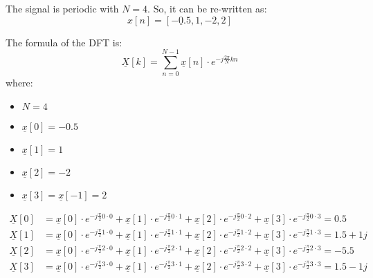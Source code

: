 \begin{solution}
	The signal is periodic with $N = 4$. So, it can be re-written as:
	\begin{equation*}
		x[n] = \left[\underline{-0.5}, 1, -2, 2\right]
	\end{equation*}
	
	\begin{tasks}
		\task
		The formula of the DFT is:
		\begin{equation}
			\underline{X}[k] = \sum\limits_{n = 0}^{N - 1} \underline{x}[n] \cdot e^{- j \frac{2 \pi}{N} k n}
		\end{equation}
		where:
		\begin{itemize}
			\item $N = 4$
			\item $\underline{x}[0] = -0.5$
			\item $\underline{x}[1] = 1$
			\item $\underline{x}[2] = -2$
			\item $\underline{x}[3] = \underline{x}[-1] = 2$
		\end{itemize}
		
		\begin{equation*}
			\begin{split}
				\underline{X}[0] &= \underline{x}[0] \cdot e^{-j \frac{\pi}{2} 0 \cdot 0} + \underline{x}[1] \cdot e^{-j \frac{\pi}{2} 0 \cdot 1} + \underline{x}[2] \cdot e^{-j \frac{\pi}{2} 0 \cdot 2} + \underline{x}[3] \cdot e^{-j \frac{\pi}{2} 0 \cdot 3} = 0.5 \\
				\underline{X}[1] &= \underline{x}[0] \cdot e^{-j \frac{\pi}{2} 1 \cdot 0} + \underline{x}[1] \cdot e^{-j \frac{\pi}{2} 1 \cdot 1} + \underline{x}[2] \cdot e^{-j \frac{\pi}{2} 1 \cdot 2} + \underline{x}[3] \cdot e^{-j \frac{\pi}{2} 1 \cdot 3} = 1.5+1j \\
				\underline{X}[2] &= \underline{x}[0] \cdot e^{-j \frac{\pi}{2} 2 \cdot 0} + \underline{x}[1] \cdot e^{-j \frac{\pi}{2} 2 \cdot 1} + \underline{x}[2] \cdot e^{-j \frac{\pi}{2} 2 \cdot 2} + \underline{x}[3] \cdot e^{-j \frac{\pi}{2} 2 \cdot 3} = -5.5 \\
				\underline{X}[3] &= \underline{x}[0] \cdot e^{-j \frac{\pi}{2} 3 \cdot 0} + \underline{x}[1] \cdot e^{-j \frac{\pi}{2} 3 \cdot 1} + \underline{x}[2] \cdot e^{-j \frac{\pi}{2} 3 \cdot 2} + \underline{x}[3] \cdot e^{-j \frac{\pi}{2} 3 \cdot 3} = 1.5-1j
			\end{split}
		\end{equation*}
		

\end{tasks}
\end{solution}
